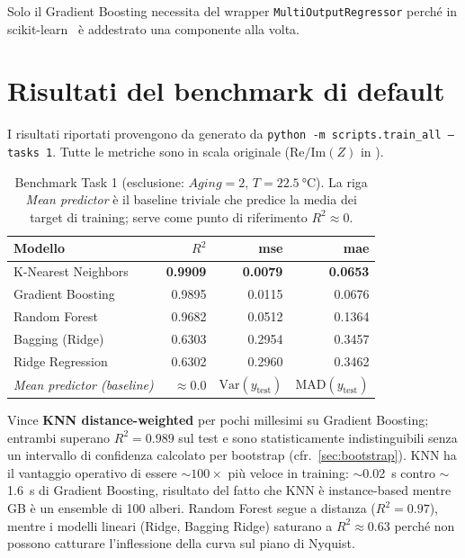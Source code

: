 Solo il Gradient Boosting necessita del wrapper
\texttt{MultiOutputRegressor} perché in
scikit-learn~\cite{pedregosa2011scikit} è addestrato una componente
alla volta.

\newpage
\section{Risultati del benchmark di default}

I risultati riportati provengono da 
generato da \texttt{python -m scripts.train\_all --tasks 1}. Tutte le
metriche sono in scala originale ($\mathrm{Re}/\mathrm{Im}(Z)$ in
\milliohm).

\begin{table}[H]
  \centering
  \caption{Benchmark Task 1 (esclusione: $Aging=2$, $T=\SI{22.5}{\celsius}$).
  La riga \emph{Mean predictor} è il baseline triviale che predice la
  media dei target di training; serve come punto di riferimento
  $R^2 \approx 0$.}
  \label{tab:task1-benchmark}
  \begin{tabular}{lrrr}
    \toprule
    \textbf{Modello} & $R^{2}$ & \acrshort{mse} & \acrshort{mae} \\
    \midrule
    K-Nearest Neighbors & \textbf{0.9909} & \textbf{0.0079} & \textbf{0.0653} \\
    Gradient Boosting & 0.9895 & 0.0115 & 0.0676 \\
    Random Forest & 0.9682 & 0.0512 & 0.1364 \\
    Bagging (Ridge) & 0.6303 & 0.2954 & 0.3457 \\
    Ridge Regression & 0.6302 & 0.2960 & 0.3462 \\
    \midrule
    \emph{Mean predictor (baseline)} & $\approx 0.0$ & $\mathrm{Var}(y_\text{test})$ & $\mathrm{MAD}(y_\text{test})$ \\
    \bottomrule
  \end{tabular}
\end{table}

Vince \textbf{KNN distance-weighted} per pochi millesimi su Gradient
Boosting; entrambi superano $R^{2} = 0.989$ sul test e sono
statisticamente indistinguibili senza un intervallo di confidenza
calcolato per bootstrap (cfr.~\cref{sec:bootstrap}). KNN ha il
vantaggio operativo di essere $\sim 100\times$ più veloce in training:
$\sim$\SI{0.02}{s} contro $\sim$\SI{1.6}{s} di Gradient Boosting,
risultato del fatto che KNN è instance-based mentre GB è un ensemble di
100 alberi. Random Forest segue a distanza ($R^{2}=0.97$), mentre i
modelli lineari (Ridge, Bagging Ridge) saturano a $R^{2}\!\approx\!0.63$
perché non possono catturare l'inflessione della curva sul piano di
Nyquist.

